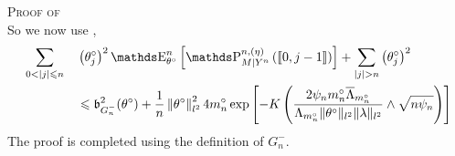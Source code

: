 \begin{pro}{\textsc{Proof of } \\}
So we now use ,
\begin{alignat*}{2}
& \sum\limits_{0 < \vert j \vert \leq n} && \left(\theta^{\circ}_{j}\right)^{2} \E_{\theta^{\circ}}^{n}\left[\P_{M \vert Y^{n}}^{n, (\eta)}\left(\llbracket 0, j-1 \rrbracket \right)\right] + \sum\limits_{ \vert j \vert > n} \left( \theta^{\circ}_{j}\right)^{2}\\
& && \leq \mathfrak{b}_{G^{-}_{n}}^{2}(\theta^{\circ}) + \frac{1}{n} \left\Vert \theta^{\circ}\right\Vert_{l^{2}}^{2} 4 m^{\circ}_{n} \exp\left[- K \left(\frac{2 \psi_{n} m^{\circ}_{n} \overline{\Lambda}_{m^{\circ}_{n}}}{\Lambda_{m^{\circ}_{n}} \Vert \theta^{\circ} \Vert_{l^{2}} \Vert \lambda \Vert_{l^{2}}} \wedge \sqrt{n \psi_{n}}\right)\right]
\end{alignat*}
The proof is completed using the definition of $G^{-}_{n}$.

\qedsymbol
\end{pro}